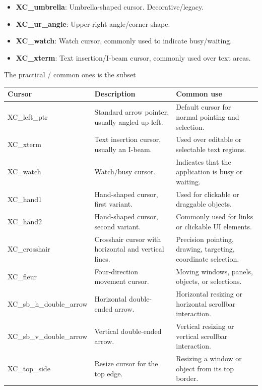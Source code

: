 \documentclass{report}
\begin{document}
\begin{itemize}
\begin{itemize}
                \item \textbf{XC\_umbrella}:	Umbrella-shaped cursor. Decorative/legacy.
                \item \textbf{XC\_ur\_angle}:	Upper-right angle/corner shape.
                \item \textbf{XC\_watch}:	Watch cursor, commonly used to indicate busy/waiting.
                \item \textbf{XC\_xterm}:	Text insertion/I-beam cursor, commonly used over text areas.
            \end{itemize}
            The practical / common ones is the subset
            \begin{center}
                \begin{tabularx}{\textwidth}{@{}lXX@{}}
                    \toprule
                    \textbf{Cursor}&	\textbf{Description}&	\textbf{Common use} \\
                    \midrule
                    XC\_left\_ptr	&Standard arrow pointer, usually angled up-left.	&Default cursor for normal pointing and selection.\\[2ex]
                    XC\_xterm	&Text insertion cursor, usually an I-beam.	&Used over editable or selectable text regions.\\[2ex]
                    XC\_watch	&Watch/busy cursor.	&Indicates that the application is busy or waiting.\\[2ex]
                    XC\_hand1	&Hand-shaped cursor, first variant.	&Used for clickable or draggable objects.\\[2ex]
                    XC\_hand2	&Hand-shaped cursor, second variant.	&Commonly used for links or clickable UI elements.\\[2ex]
                    XC\_crosshair	&Crosshair cursor with horizontal and vertical lines.	&Precision pointing, drawing, targeting, coordinate selection.\\[2ex]
                    XC\_fleur	&Four-direction movement cursor.	&Moving windows, panels, objects, or selections.\\[2ex]
                    XC\_sb\_h\_double\_arrow	&Horizontal double-ended arrow.	&Horizontal resizing or horizontal scrollbar interaction.\\[2ex]
                    XC\_sb\_v\_double\_arrow	&Vertical double-ended arrow.	&Vertical resizing or vertical scrollbar interaction.\\[2ex]
                    XC\_top\_side	&Resize cursor for the top edge.	&Resizing a window or object from its top border.\\[2ex]

\end{tabularx}
\end{center}
\end{itemize}
\end{document}
